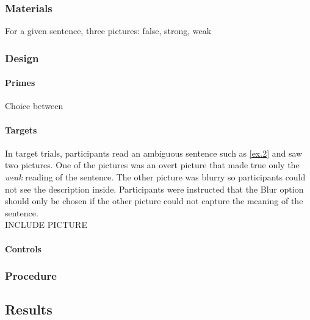 \documentclass[a4paper]{article}
\begin{document}
\subsubsection{Materials}

For a given sentence, three pictures:
false, strong, weak

\subsubsection{Design}

\paragraph{Primes}
Choice between 



\paragraph{Targets}
In target trials, participants read an ambiguous sentence such as \ref{ex.2} and saw two pictures. One of the pictures was an overt picture that made true only the \textit{weak} reading of the sentence.  The other picture was blurry so participants could not see the description inside. Participants were instructed that the Blur option should only be chosen if the other picture could not capture the meaning of the sentence. 
\\
INCLUDE PICTURE

\paragraph{Controls}

\subsubsection{Procedure}

\subsection{Results}
\end{document}
